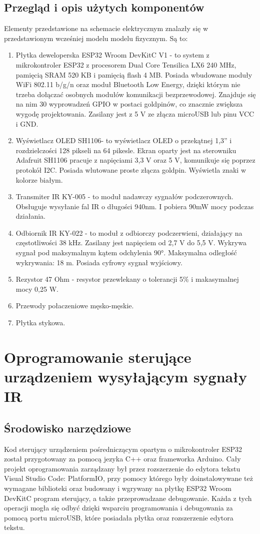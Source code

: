\documentclass[12pt,twoside]{article}
\begin{document}
\subsection{Przegląd i opis użytych komponentów}
Elementy przedstawione na schemacie elektrycznym znalazły się w przedstawionym wcześniej modelu modelu fizycznym. Są to:
\begin{enumerate}[label=\alph*), leftmargin=1.25cm]
   \item Płytka deweloperska ESP32 Wroom DevKitC V1\cite{doitDevKitV1} - to system z mikrokontroler ESP32 z procesorem Dual Core Tensilica LX6 240 MHz, pamięcią SRAM 520 KB i pamięcią flash 4 MB. Posiada wbudowane moduły WiFi 802.11 b/g/n oraz moduł Bluetooth Low Energy, dzięki którym nie trzeba dołączać osobnych modułów komunikacji bezprzewodowej. Znajduje się na nim 30 wyprowadzeń GPIO w postaci goldpinów, co znacznie zwiększa wygodę projektowania. Zasilany jest z 5 V ze złącza microUSB lub pinu VCC i GND.
   \item Wyświetlacz OLED SH1106\cite{sh1106}- to wyświetlacz OLED o przekątnej 1,3'' i rozdzielczości 128 pikseli na 64 pikesle. Ekran oparty jest na sterowniku Adafruit SH1106 pracuje z napięciami 3,3 V oraz 5 V, komunikuje się poprzez protokół I2C. Posiada wlutowane proste złącza goldpin. Wyświetla znaki w kolorze białym.
   \item Transmiter IR KY-005\cite{ky005} - to moduł nadawczy sygnałów podczerownych. Obsługuje wysyłanie fal IR o długości 940nm. I pobiera 90mW mocy podczas działania.
   \item Odbiornik IR KY-022\cite{ky022}  - to moduł z odbiorczy podczerwieni, działający na częstotliwości 38 kHz. Zasilany jest napięciem od 2,7 V do 5,5 V. Wykrywa sygnał pod maksymalnym kątem odchylenia 90°. Maksymalna odległość wykrywania: 18 m. Posiada cyfrowy sygnał wyjściowy.
   \item Rezystor 47 Ohm - resystor przewlekany o tolerancji 5\% i makasymalnej mocy 0,25 W.
   \item Przewody połaczeniowe męsko-męskie.
   \item Płytka stykowa.
\end{enumerate}

\clearpage

\section{Oprogramowanie sterujące urządzeniem wysyłającym sygnały IR}
\subsection{Środowisko narzędziowe}
Kod sterujący urządzeniem pośredniczącym opartym o mikrokontroler ESP32 został przygotowany za pomocą jezyka C++ oraz frameworka Arduino. Cały projekt oprogramowania zarządzany był przez rozszerzenie do edytora tekstu Visual Studio Code: PlatformIO, przy pomocy którego były doinstalowywane też wymagane biblioteki oraz budowany i wgrywany na płytkę ESP32 Wroom DevKitC program sterujący, a także przeprowadzane debugowanie. Każda z tych operacji mogła się odbyć dzięki wsparciu programowania i debugowania za pomocą portu microUSB, które posiadała płytka oraz rozszerzenie edytora tekstu.
\end{document}
